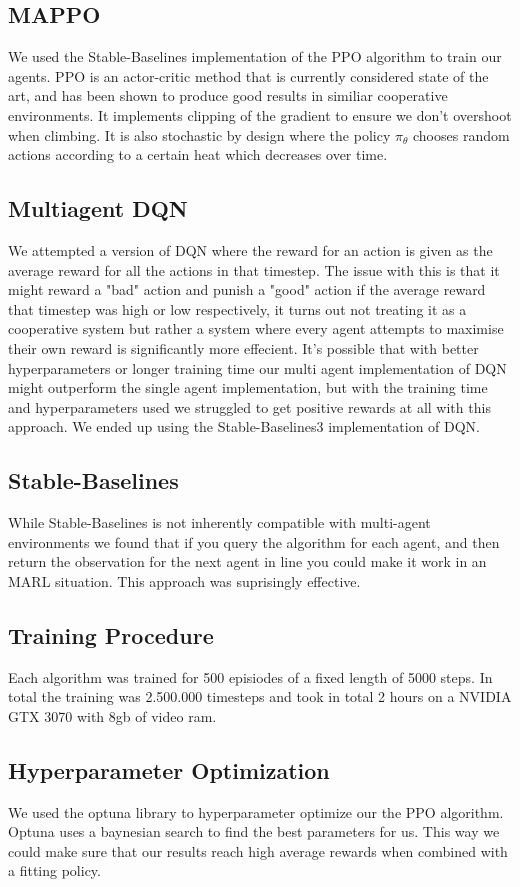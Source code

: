 \documentclass[conference]{IEEEtran}
\begin{document}
\subsection{MAPPO}
We used the Stable-Baselines implementation of the PPO algorithm to train our agents.
PPO is an actor-critic method that is currently considered state of the art, and has been shown to produce good results in similiar cooperative environments. %
It implements clipping of the gradient to ensure we don't overshoot when climbing.
It is also stochastic by design where the policy $\pi_\theta$ chooses random actions according to a certain heat which decreases over time.

\subsection{Multiagent DQN}
We attempted a version of DQN where the reward for an action is given as the average reward for all the actions in that timestep. The issue with this is that it might reward a "bad" action and punish a "good" action if the average reward that timestep was high or low respectively, it turns out not treating it as a cooperative system but rather a system where every agent attempts to maximise their own reward is significantly more effecient.
It's possible that with better hyperparameters or longer training time our multi agent implementation of DQN might outperform the single agent implementation, but with the training time and hyperparameters used we struggled to get positive rewards at all with this approach. We ended up using the Stable-Baselines3 implementation of DQN.
\subsection{Stable-Baselines}
While Stable-Baselines is not inherently compatible with multi-agent environments we found that if you
query the algorithm for each agent, and then return the observation for the next agent in line you could make it work in an MARL situation. This approach was suprisingly effective.

\subsection{Training Procedure}
Each algorithm was trained for 500 episiodes of a fixed length of 5000 steps. In total the training was
2.500.000 timesteps and took in total 2 hours on a NVIDIA GTX 3070 with 8gb of video ram.
\subsection{Hyperparameter Optimization}
We used the optuna library to hyperparameter optimize our the PPO algorithm. Optuna uses a baynesian search to find the best parameters for us. This way we could make sure that our results reach high average rewards when combined with a fitting policy.
\end{document}
